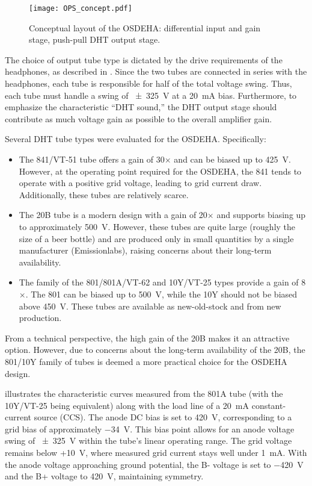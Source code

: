 \begin{figure}
\begin{center}
\texttt{[image: OPS\_concept.pdf]}
\caption{Conceptual layout of the OSDEHA: differential input and gain stage, push-pull DHT output stage.}
\end{center}
\end{figure}

The choice of output tube type is dictated by the drive requirements of the headphones, as described in . Since the two tubes are connected in series with the headphones, each tube is responsible for half of the total voltage swing. Thus, each tube must handle a swing of \SI{\pm325}{V} at a \SI{20}{mA} bias. Furthermore, to emphasize the characteristic ``DHT sound,'' the DHT output stage should contribute as much voltage gain as possible to the overall amplifier gain.

Several DHT tube types were evaluated for the OSDEHA\cite{osdeha_p9,osdeha_whichDHT}. Specifically:

\begin{itemize}
\item The 841/VT-51 tube offers a gain of 30$\times$ and can be biased up to \SI{425}{V}. However, at the operating point required for the OSDEHA, the 841 tends to operate with a positive grid voltage, leading to grid current draw. Additionally, these tubes are relatively scarce.
\item The 20B tube is a modern design with a gain of 20$\times$ and supports biasing up to approximately \SI{500}{V}. However, these tubes are quite large (roughly the size of a beer bottle) and are produced only in small quantities by a single manufacturer (Emissionlabs), raising concerns about their long-term availability.
\item The family of the 801/801A/VT-62 and 10Y/VT-25 types\cite{aasyl_801types} provide a gain of 8$\times$. The 801 can be biased up to \SI{500}{V}, while the 10Y should not be biased above \SI{450}{V}. These tubes are available as new-old-stock and from new production.
\end{itemize}

From a technical perspective, the high gain of the 20B makes it an attractive option. However, due to concerns about the long-term availability of the 20B, the 801/10Y family of tubes is deemed a more practical choice for the OSDEHA design.



 illustrates the characteristic curves measured from the 801A tube (with the 10Y/VT-25 being equivalent) along with the load line of a \SI{20}{mA} constant-current source (CCS). The anode DC bias is set to \SI{420}{V}, corresponding to a grid bias of approximately \SI{-34}{V}. This bias point allows for an anode voltage swing of \SI{\pm325}{V} within the tube's linear operating range. The grid voltage remains below +\SI{10}{V}, where measured grid current stays well under \SI{1}{mA}. With the anode voltage approaching ground potential, the B- voltage is set to \SI{-420}{V} and the B+ voltage to \SI{+420}{V}, maintaining symmetry.

